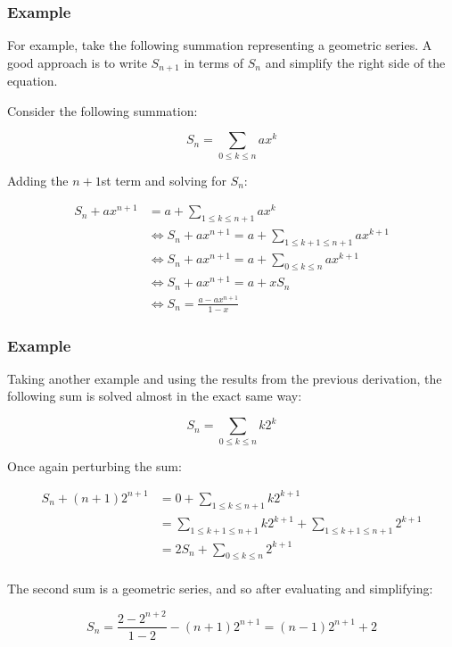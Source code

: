 \documentclass{standalone}
\begin{document}
\subsubsection{Example}

For example, take the following summation representing a geometric series. A
good approach is to write $S_{n+1}$ in terms of $S_n$ and simplify the right
side of the equation.

Consider the following summation:

\[
  S_n = \sum_{0 \leqslant k \leqslant n} ax^k
\]

Adding the $n+1$st term and solving for $S_n$:

\begin{align*}
  S_n + ax^{n+1} &= a + \sum_{1 \leqslant k \leqslant n+1} ax^k \\
  &\iff S_n + ax^{n+1} = a + \sum_{1 \leqslant k+1 \leqslant n+1} ax^{k+1} \\
  &\iff S_n + ax^{n+1} = a + \sum_{0 \leqslant k \leqslant n} ax^{k+1} \\
  &\iff S_n + ax^{n+1} = a + xS_n \\
  &\iff S_n = \frac {a - ax^{n+1}} {1 - x}
\end{align*}

\subsubsection{Example}

Taking another example and using the results from the previous derivation, the
following sum is solved almost in the exact same way:

\[
  S_n = \sum_{0 \leqslant k \leqslant n} k2^k
\]

Once again perturbing the sum:

\begin{align*}
  S_n + (n+1)2^{n+1} &= 0 + \sum_{1 \leqslant k \leqslant n+1} k2^{k+1} \\
  &= \sum_{1 \leqslant k+1 \leqslant n+1} k2^{k+1} + \sum_{1 \leqslant k+1 \leqslant n+1} 2^{k+1} \\
  &= 2S_n + \sum_{0 \leqslant k \leqslant n} 2^{k+1} \\
\end{align*}

The second sum is a geometric series, and so after evaluating and simplifying:

\[
  S_n = \frac {2 - 2^{n+2}} {1 - 2} - (n+1)2^{n+1} = (n-1)2^{n+1} + 2
\]
\end{document}
